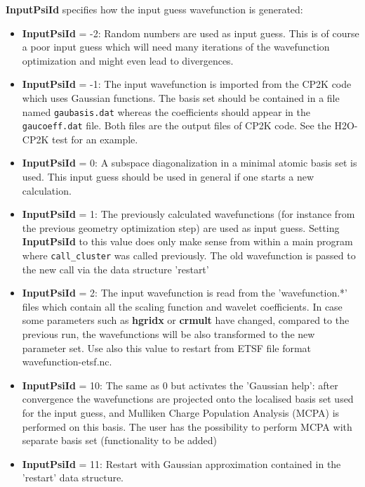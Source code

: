 \documentclass[a4paper,11pt]{report}
\begin{document}
\begin{itemize}
      {\bf InputPsiId } specifies how the input guess wavefunction is generated:
      \begin{itemize}
      \item {\bf InputPsiId } = -2: Random numbers are used as input guess. This is of course a poor input guess which will 
            need many iterations of the wavefunction optimization and might even lead to divergences.
      \item {\bf InputPsiId } = -1: The input wavefunction is imported from the CP2K code which
            uses Gaussian functions. 
            The basis set should be contained in a file named \texttt{gaubasis.dat} 
            whereas the coefficients should appear in the \texttt{gaucoeff.dat} file. 
            Both files are the output files of CP2K code. See the H2O-CP2K test for an example.
      \item {\bf InputPsiId } = 0: A subspace diagonalization in a minimal atomic basis set is used.
            This input guess should be used in general if one starts a new calculation. 
      \item {\bf InputPsiId } = 1: The previously calculated wavefunctions (for instance from the previous 
            geometry optimization step) are used as input guess. Setting {\bf InputPsiId } to 
            this value does only make sense from within a main program where \texttt{call\_cluster} was 
            called previously. The old wavefunction is passed to the new call via the data structure 'restart'
      \item {\bf InputPsiId } = 2: The input wavefunction is read from the 'wavefunction.*' files which contain all the 
            scaling function and wavelet coefficients. In case some parameters such as {\bf hgridx} 
            or {\bf crmult} have changed, compared to the previous run, the wavefunctions will be 
            also transformed to the new parameter set. Use also this value to restart from ETSF file format wavefunction-etsf.nc.
      \item {\bf InputPsiId } = 10: The same as 0 but activates the 'Gaussian help': 
            after convergence the wavefunctions are projected onto the localised basis set used for
            the input guess, and Mulliken Charge Population Analysis (MCPA) is performed on this
            basis. The user has the possibility to perform MCPA with separate basis set (functionality to be added)
       \item {\bf InputPsiId } = 11: Restart with Gaussian approximation contained in the 'restart' data structure.

\end{itemize}
\end{itemize}
\end{document}
